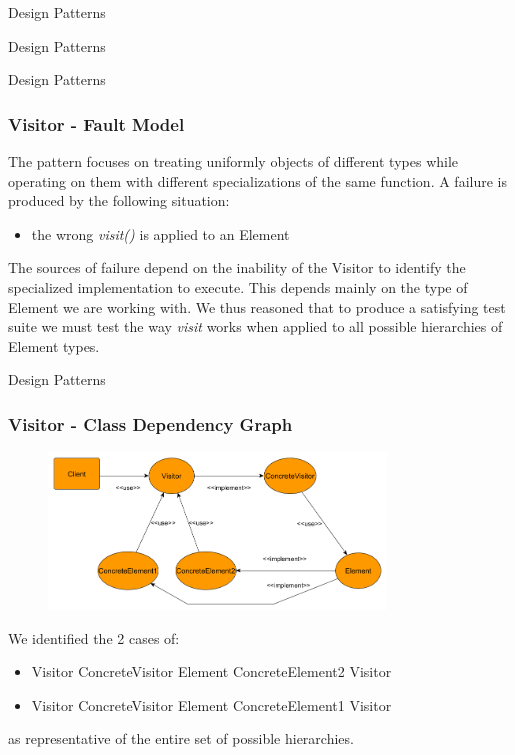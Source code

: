 \documentclass{beamer}
\begin{document}
\begin{section}{Design Patterns}
\begin{subsection}{Design Patterns}
\begin{frame}
	\end{frame}
\end{subsection}

\begin{subsection}{Design Patterns}
	\begin{frame}
		\frametitle{Visitor - Fault Model}
The pattern focuses on treating uniformly objects of different types while operating on them with different specializations of the same function. A failure is produced by the following situation:  
\begin{itemize}
	\item the wrong \textit{visit()} is applied to an Element
\end{itemize}
		\vspace{5mm}
The sources of failure depend on the inability of the Visitor to identify the specialized implementation to execute. This depends mainly on the type of Element we are working with. We thus reasoned that to produce a satisfying test suite we must test the way \textit{visit} works when applied to all possible hierarchies of Element types.
		
	\end{frame}
\end{subsection}

\begin{subsection}{Design Patterns}
	\begin{frame}
		\frametitle{Visitor - Class Dependency Graph}
		
\begin{figure}[!h]
	\centering
	\includegraphics[width=0.8\textwidth]{./Visitor/ClassDependencyGraph.png}
	\label{Videpengraph}
\end{figure}
We identified the 2 cases of:
\begin{itemize}
	\item Visitor ConcreteVisitor Element ConcreteElement2 Visitor
	\item Visitor ConcreteVisitor Element ConcreteElement1 Visitor	
\end{itemize}
as representative of the entire set of possible hierarchies.
	\end{frame}
\end{subsection}





	
\end{section}
\end{document}
